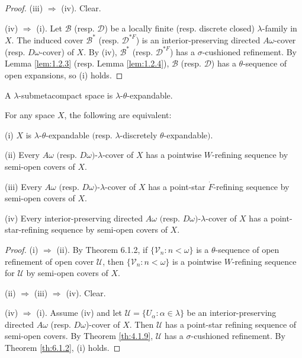 \documentclass[main.tex]{subfiles}
\begin{document}
\begin{proof}
(iii) $\Rightarrow$ (iv). Clear.

(iv) $\Rightarrow$ (i). Let $\mathscr{B}$ (resp.  $\mathscr{D}$) be a locally finite (resp. discrete closed)
$\lambda$-family in $X$. The induced cover $\mathscr{B}^*$ (resp. $\mathscr{D}^{*F}$) is 
an interior-preserving directed $A\omega$-cover (resp. $D\omega$-cover) of $X$. 
By (iv), $\mathscr{B}^*$ (resp. $\mathscr{D}^{*F}$) has a $\sigma$-cushioned refinement. 
By Lemma \ref{lem:1.2.3} (resp. Lemma \ref{lem:1.2.4}), $\mathscr{B}$ (resp. $\mathscr{D}$) 
has a $\theta$-sequence of open expansions, so (i) holds.
\end{proof}

{\corollary{} \label{cor:6.1.3}
A $\lambda$-submetacompact space is $\lambda$-$\theta$-expandable.\hfill\qedsymbol
}

{\theorem{} \label{th:6.1.4}
 For any space $X$, the following are equivalent:

\textup{(i)}  $X$ is $\lambda$-$\theta$-expandable $($resp. $\lambda$-discretely $\theta$-expandable$)$.

\textup{(ii)}  Every $A\omega$ $($resp. $D\omega)$-$\lambda$-cover of $X$ has a pointwise 
$W$-refining sequence by semi-open covers of $X$.

\textup{(iii)}  Every $A\omega$ $($resp. $D\omega)$-$\lambda$-cover of $X$ has a point-star 
$\dot{F}$-refining sequence by semi-open covers of $X$.

\textup{(iv)}  Every interior-preserving directed $A\omega$ $($resp. $D\omega)$-$\lambda$-cover 
 of $X$ has a point-star-refining sequence by semi-open covers of $X$.
}

\begin{proof}
(i) $\Rightarrow$ (ii). By Theorem 6.1.2, if $\{\mathscr{V}_n: n < \omega\}$ is a $\theta$-sequence
 of open refinement of open cover $\mathscr{U}$, 
 then $\{\mathscr{V}_n: n < \omega\}$ is a pointwise $W$-refining sequence for $\mathscr{U}$ 
 by semi-open covers of $X$.

(ii) $\Rightarrow$ (iii) $\Rightarrow$ (iv). Clear.

 (iv) $\Rightarrow$ (i). Assume (iv) and let $\mathscr{U}= \{U_\alpha: \alpha \in \lambda\}$ 
 be an interior-preserving directed 
 $A\omega$ (resp. $D\omega$)-cover of $X$. Then $\mathscr{U}$ has a 
 point-star refining 
 sequence of semi-open covers. By Theorem \ref{th:4.1.9}, $\mathscr{U}$ has a 
 $\sigma$-cushioned refinement. 
 By Theorem \ref{th:6.1.2}, (i) holds.
\end{proof}
\end{document}

